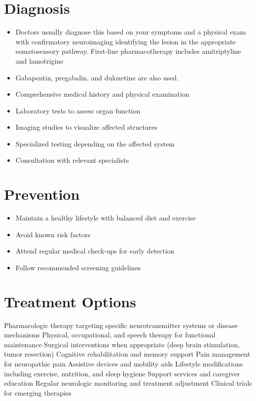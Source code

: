 \section{Diagnosis}
\begin{itemize}[noitemsep]
  \item Doctors usually diagnose this based on your symptoms and a physical exam with confirmatory neuroimaging identifying the lesion in the appropriate somatosensory pathway. First-line pharmacotherapy includes amitriptyline and lamotrigine
  \item Gabapentin, pregabalin, and duloxetine are also used.
  \item Comprehensive medical history and physical examination
  \item Laboratory tests to assess organ function
  \item Imaging studies to visualize affected structures
  \item Specialized testing depending on the affected system
  \item Consultation with relevant specialists
\end{itemize}
\section{Prevention}
\begin{itemize}[noitemsep]
  \item Maintain a healthy lifestyle with balanced diet and exercise
  \item Avoid known risk factors
  \item Attend regular medical check-ups for early detection
  \item Follow recommended screening guidelines
\end{itemize}
\section{Treatment Options}
Pharmacologic therapy targeting specific neurotransmitter systems or disease mechanisms Physical, occupational, and speech therapy for functional maintenance Surgical interventions when appropriate (deep brain stimulation, tumor resection) Cognitive rehabilitation and memory support Pain management for neuropathic pain Assistive devices and mobility aids Lifestyle modifications including exercise, nutrition, and sleep hygiene Support services and caregiver education Regular neurologic monitoring and treatment adjustment Clinical trials for emerging therapies


